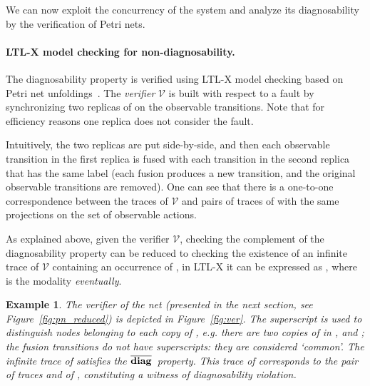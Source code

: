 \documentclass[a4paper]{article}
\newcommand{\veri}  {\ensuremath{\mathcal{V}}\xspace}
\newcommand{\ndiagltl}   {\ensuremath{\overline{\bf diag}\xspace}}
\newtheorem{exmp}{Example}
\begin{document}
We can now exploit the concurrency of the system and analyze its diagnosability by the verification of Petri nets. 

\paragraph{LTL-X model checking for non-diagnosability.}

The diagnosability property is verified using LTL-X model checking based on Petri net unfoldings~\cite{Madalinski2010}.  The \emph{verifier} \veri is built with respect to a fault  by synchronizing two replicas of  on the observable transitions. Note that for efficiency reasons one replica does not consider the fault. 

Intuitively, the two replicas are put side-by-side, and then each observable transition in the first replica is fused with each transition in the second replica that has the same label (each fusion produces a new transition, and the original observable transitions are removed). One can see that there is a one-to-one correspondence between the traces of \veri and pairs of traces of  with the same projections on the set of observable actions.

As explained above, given the verifier \veri, checking the complement  of the diagnosability property can be reduced to checking the existence of an infinite trace of \veri containing an occurrence of , in LTL-X it can be expressed as , where  is the modality \emph{eventually}.

\begin{exmp} 
  The verifier  of the net  (presented in the next section, see Figure~\ref{fig:pn_reduced}) is depicted in Figure~\ref{fig:ver}. The superscript is used to distinguish nodes belonging 
to each copy of , e.g. there are two copies of  in ,  and ; the fusion transitions do not have superscripts: they are considered `common'. The infinite trace of  satisfies  the \ndiagltl\ property. This trace of  corresponds to the pair of traces  and   of , constituting a witness of diagnosability violation.
  \label{ex:veri}
\end{exmp}
\end{document}
